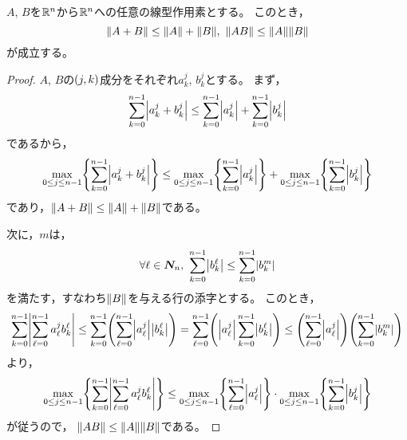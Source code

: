 \documentclass[b5paper,draft]{ltjsbook}
\begin{document}
\begin{prop}[作用素ノルムの不等式2]
    $A$, $B$を$\mathbb{R}^n$から$\mathbb{R}^n$への任意の線型作用素とする。
    このとき，
    \begin{equation}
        \norm{A+B}\leq \norm{A}+\norm{B},\ \norm{AB}\leq \norm{A}\norm{B}
    \end{equation}
    が成立する。
    \begin{proof}
        $A$, $B$の$\pare{j,k}$成分をそれぞれ$a^j_k$, $b^j_k$とする。
        まず，
        \begin{equation}
            \sum_{k=0}^{n-1}\abs{a^j_k+b^j_k}
            \leq \sum_{k=0}^{n-1}\abs{a^j_k}
            +\sum_{k=0}^{n-1}\abs{b^j_k}
        \end{equation}
        であるから，
        \begin{equation}
            \max_{0\leq j\leq n-1}\bra{\sum_{k=0}^{n-1}\abs{a^j_k+b^j_k}}
            \leq \max_{0\leq j\leq n-1}\bra{\sum_{k=0}^{n-1}\abs{a^j_k}}
            +\max_{0\leq j\leq n-1}\bra{\sum_{k=0}^{n-1}\abs{b^j_k}}
        \end{equation}
        であり，$\norm{A+B}\leq \norm{A}+\norm{B}$である。
        
        次に，$m$は，
        \begin{equation}
            \forall \ell\in \setN,\
            \sum_{k=0}^{n-1}\abs{b^{\ell}_k}\leq
            \sum_{k=0}^{n-1}\abs{b^m_k}
        \end{equation}
        を満たす，すなわち$\norm{B}$を与える行の添字とする。
        このとき，
        \begin{equation}
            \sum_{k=0}^{n-1}\abs{\sum_{\ell=0}^{n-1}a^j_\ell b^\ell_k}
            \leq \sum_{k=0}^{n-1}\pare{\sum_{\ell=0}^{n-1}\abs{a^j_\ell }\abs{b^\ell_k}}
            =\sum_{\ell=0}^{n-1}\pare{\abs{a^j_\ell }\sum_{k=0}^{n-1}\abs{b^\ell_k}}
            \leq \pare{\sum_{\ell=0}^{n-1}\abs{a^j_\ell }}
            \pare{\sum_{k=0}^{n-1}\abs{b^m_k}}
        \end{equation}
        より，
        \begin{equation}
            \max_{0\leq j\leq n-1}\bra{\sum_{k=0}^{n-1}\abs{\sum_{\ell=0}^{n-1}a^j_\ell b^\ell_k}}
            \leq \max_{0\leq j\leq n-1}\bra{\sum_{\ell=0}^{n-1}\abs{a^j_\ell }}\cdot \max_{0\leq j\leq n-1}\bra{\sum_{k=0}^{n-1}\abs{b^j_k}}
        \end{equation}
        が従うので，
        $\norm{AB}\leq \norm{A}\norm{B}$である。
    \end{proof}
\end{prop}
\end{document}
